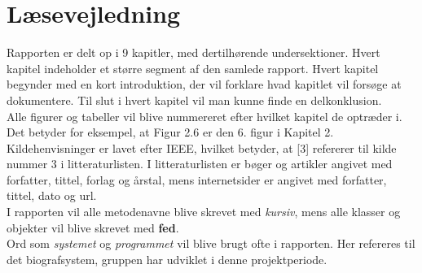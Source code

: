 \newpage
\section*{Læsevejledning}
Rapporten er delt op i 9 kapitler, med dertilhørende undersektioner. Hvert kapitel indeholder et større segment af den samlede rapport.
Hvert kapitel begynder med en kort introduktion, der vil forklare hvad kapitlet vil forsøge at dokumentere. 
Til slut i hvert kapitel vil man kunne finde en delkonklusion.\\ 

Alle figurer og tabeller vil blive nummereret efter hvilket kapitel de optræder i. Det betyder for eksempel, at Figur 2.6 er den 
6. figur i Kapitel 2. \\

Kildehenvisninger er lavet efter IEEE, hvilket betyder, at [3] refererer til kilde nummer 3 i litteraturlisten. 
I litteraturlisten er bøger og artikler angivet med forfatter, tittel, forlag og årstal, mens internetsider er angivet med forfatter, tittel, dato og url. \\ 

I rapporten vil alle metodenavne blive skrevet med \textit{kursiv}, mens alle klasser og objekter vil blive skrevet med \textbf{fed}.\\

Ord som \textit{systemet} og \textit{programmet} vil blive brugt ofte i rapporten. Her refereres til det biografsystem, gruppen har udviklet i denne projektperiode.
